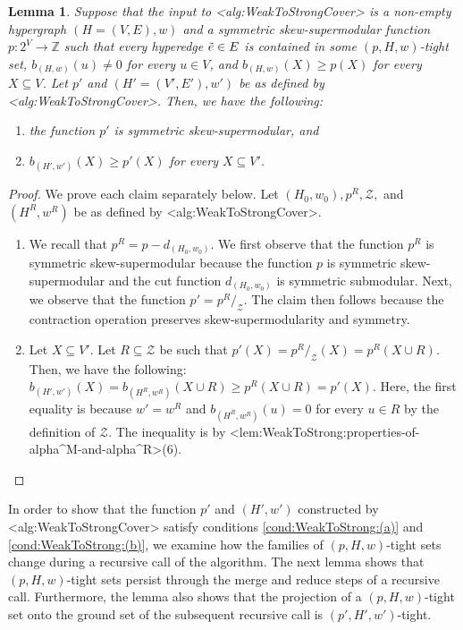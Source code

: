 \documentclass{article}
\def\Cref#1{<#1>}%
\newtheorem{lemma}{Lemma}[section]
\newcommand{\zeros}{\ensuremath{\mathcal{Z}}\xspace}
\newcommand{\tightSetFamily}[1]{\ensuremath{T_{#1}}\xspace}
\newcommand{\functionContract}[2]{\ensuremath{{#1}/_{#2}}\xspace}
\providecommand{\Z}{\mathbb{Z}}
\begin{document}
\begin{lemma}\label{lem:weak-to-strong-cover:next-recursive-call-hypothesis-satification:symm-skew-supermod-strong-cover}
Suppose that the input to \Cref{alg:WeakToStrongCover} is a non-empty hypergraph $(H = (V, E), w)$ and a symmetric skew-supermodular function $p:2^V\rightarrow \Z$ %
such that every hyperedge $\Tilde{e} \in E$ is contained in some $(p, H, w)$-tight set, $b_{(H,w)}(u) \not = 0$ for every $u \in V$, and $b_{(H,w)}(X) \geq p(X)$ for every $X \subseteq V$. 
Let $p'$ and $(H' = (V', E'), w')$ be as defined by \Cref{alg:WeakToStrongCover}. Then, we have the following:
\begin{enumerate}
    \item the function $p'$ is symmetric skew-supermodular, and
    \item $b_{(H', w')}(X) \geq p'(X)$ for every $X \subseteq V'$.
\end{enumerate}
\end{lemma}
\begin{proof} We prove each claim separately below. Let $(H_0, w_0), p^R, \zeros,$ and $(H^R, w^R)$ be as defined by \Cref{alg:WeakToStrongCover}.
\begin{enumerate}
    \item We recall that $p^R =  p - d_{(H_0, w_0)}$. We first observe that the function $p^R$ is symmetric skew-supermodular because the function $p$ is symmetric skew-supermodular and the cut function $d_{(H_0, w_0)}$ is symmetric submodular. Next, we observe that the function $p' = \functionContract{p^R}{\zeros}$. The claim then follows because the contraction operation preserves skew-supermodularity and symmetry.
    \item Let $X \subseteq V'$. Let $R \subseteq \zeros$ be such that $p'(X) = \functionContract{p^R}{\zeros}(X) = p^R(X \cup R)$. Then, we have the following: $b_{(H', w')}(X) = b_{(H^R, w^R)}(X \cup R) \geq p^R(X \cup R) = p'(X)$. Here, the first equality is because $w' = w^R$ and $b_{(H^R, w^R)}(u) = 0$ for every $u \in R$ by the definition of $\zeros$. The inequality is by \Cref{lem:WeakToStrong:properties-of-alpha^M-and-alpha^R}(6).  
\end{enumerate}
\end{proof}

In order to show that the function $p'$ and $(H',w')$ constructed by \Cref{alg:WeakToStrongCover} satisfy conditions \ref{cond:WeakToStrong:(a)} and \ref{cond:WeakToStrong:(b)}, we examine how the families of $(p, H, w)$-tight sets change during a recursive call of the algorithm. 
The next lemma shows that $(p, H, w)$-tight sets persist through the merge and reduce steps of a recursive call. Furthermore, the lemma also shows that the projection of a $(p, H, w)$-tight set onto the ground set of the subsequent recursive call is  $(p', H', w')$-tight.
\end{document}
